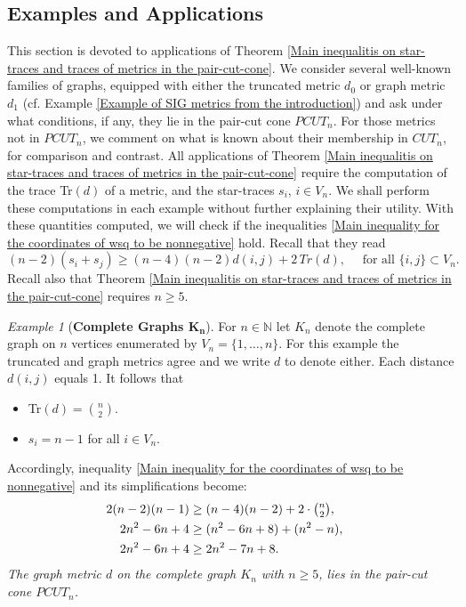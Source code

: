 \documentclass[12pt]{amsart}
\numberwithin{theorem}{section}
\theoremstyle{remark}
\newtheorem{example}[theorem]{Example}
\begin{document}
\subsection{Examples and Applications} \label{Section with examples and applications of embeddability in PCUT_n}
This section is devoted to applications of Theorem \ref{Main inequalitis on star-traces and traces of metrics in the pair-cut-cone}. We consider several well-known families of graphs, equipped with either the truncated metric $d_0$ or graph metric $d_1$ (cf. Example \ref{Example of SIG metrics from the introduction}) and ask under what conditions, if any, they lie in the pair-cut cone $PCUT_n$. For those metrics not in $PCUT_n$, we comment on what is known about their membership in $CUT_n$, for comparison and contrast. All applications of Theorem \ref{Main inequalitis on star-traces and traces of metrics in the pair-cut-cone} require the computation of the trace Tr$(d)$ of a metric, and the star-traces $s_i$, $i \in V_n$. We shall perform these computations in each example without further explaining their utility. With these quantities computed, we will check if the inequalities \eqref{Main inequality for the coordinates of wsq to be nonnegative} hold. Recall that they read
\begin{equation} \label{Main inequality stated for the second time}
(n-2)(s_i + s_j)\ge (n-4)(n-2)d(i,j) + 2\,{Tr}(d), \quad  \text{ for all } \{i,j\}\subset V_n.  
\end{equation}
Recall also that Theorem \ref{Main inequalitis on star-traces and traces of metrics in the pair-cut-cone} requires $n\ge 5$. 
\vskip3mm
\begin{example}[{\bf Complete Graphs $\mathbf{K_n}$}]
For $n\in \mathbb N$ let $K_n$ denote the complete graph on $n$ vertices enumerated by $V_n = \{1,\dots, n\}$. For this example the truncated and graph metrics agree and we write $d$ to denote either. Each distance $d(i,j)$ equals 1. It follows that 
\begin{itemize}
\item[(i)] Tr$(d) = {n\choose 2}$. 
\item[(ii)] $s_i = n-1$ for all $i\in V_n$. 
\end{itemize} 
Accordingly, inequality \eqref{Main inequality for the coordinates of wsq to be nonnegative} and its simplifications become:
\begin{align*}
2(n-2)(n-1) & \textstyle \ge (n-4)(n-2)+  2 \cdot {n\choose 2},  \cr 
2n^2-6n+4 &\ge (n^2-6n+8) + (n^2-n), \cr 
2n^2-6n+4 &\ge 2n^2-7n+8. 
\end{align*}
\vskip2mm
 {\em The graph metric $d$ on the complete graph $K_n$ with $n\ge 5$, lies in the pair-cut cone $PCUT_n$.}     
\end{example} 
\end{document}
